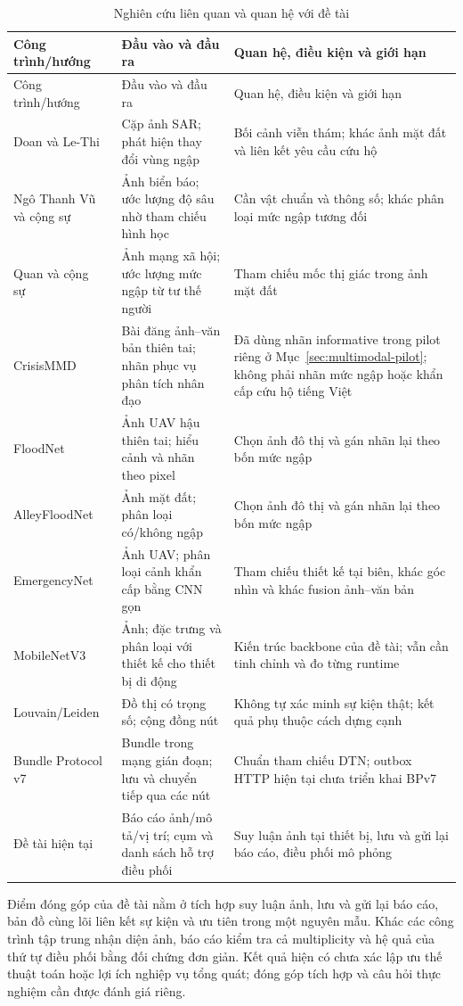 \begin{longtable}{P{.23\textwidth}P{.31\textwidth}P{.35\textwidth}}
\caption{Nghiên cứu liên quan và quan hệ với đề tài}\label{tab:related-work}\\
\toprule Công trình/hướng & Đầu vào và đầu ra & Quan hệ, điều kiện và giới hạn \\\midrule\endfirsthead
\toprule Công trình/hướng & Đầu vào và đầu ra & Quan hệ, điều kiện và giới hạn \\\midrule\endhead
Doan và Le-Thi~\citep{doan2025sar} & Cặp ảnh SAR; phát hiện thay đổi vùng ngập & Bối cảnh viễn thám; khác ảnh mặt đất và liên kết yêu cầu cứu hộ \\
Ngô Thanh Vũ và cộng sự~\citep{ngo2025urban} & Ảnh biển báo; ước lượng độ sâu nhờ tham chiếu hình học & Cần vật chuẩn và thông số; khác phân loại mức ngập tương đối \\
Quan và cộng sự~\citep{quan2020floodlevel} & Ảnh mạng xã hội; ước lượng mức ngập từ tư thế người & Tham chiếu mốc thị giác trong ảnh mặt đất \\
CrisisMMD \citep{alam2018crisismmd} & Bài đăng ảnh--văn bản thiên tai; nhãn phục vụ phân tích nhân đạo & Đã dùng nhãn informative trong pilot riêng ở Mục~\ref{sec:multimodal-pilot}; không phải nhãn mức ngập hoặc khẩn cấp cứu hộ tiếng Việt \\
FloodNet \citep{rahnemoonfar2021floodnet} & Ảnh UAV hậu thiên tai; hiểu cảnh và nhãn theo pixel & Chọn ảnh đô thị và gán nhãn lại theo bốn mức ngập \\
AlleyFloodNet \citep{lee2025alleyfloodnet} & Ảnh mặt đất; phân loại có/không ngập & Chọn ảnh đô thị và gán nhãn lại theo bốn mức ngập \\
EmergencyNet \citep{kyrkou2020emergencynet} & Ảnh UAV; phân loại cảnh khẩn cấp bằng CNN gọn & Tham chiếu thiết kế tại biên, khác góc nhìn và khác fusion ảnh--văn bản \\
MobileNetV3 \citep{howard2019mobilenetv3} & Ảnh; đặc trưng và phân loại với thiết kế cho thiết bị di động & Kiến trúc backbone của đề tài; vẫn cần tinh chỉnh và đo từng runtime \\
Louvain/Leiden \citep{blondel2008louvain,traag2019leiden} & Đồ thị có trọng số; cộng đồng nút & Không tự xác minh sự kiện thật; kết quả phụ thuộc cách dựng cạnh \\
Bundle Protocol v7 \citep{rfc9171} & Bundle trong mạng gián đoạn; lưu và chuyển tiếp qua các nút & Chuẩn tham chiếu DTN; outbox HTTP hiện tại chưa triển khai BPv7 \\
Đề tài hiện tại & Báo cáo ảnh/mô tả/vị trí; cụm và danh sách hỗ trợ điều phối & Suy luận ảnh tại thiết bị, lưu và gửi lại báo cáo, điều phối mô phỏng \\
\bottomrule
\end{longtable}

Điểm đóng góp của đề tài nằm ở tích hợp suy luận ảnh, lưu và gửi lại báo cáo, bản đồ cùng lõi liên kết sự kiện và ưu tiên trong một nguyên mẫu. Khác các công trình tập trung nhận diện ảnh, báo cáo kiểm tra cả multiplicity và hệ quả của thứ tự điều phối bằng đối chứng đơn giản. Kết quả hiện có chưa xác lập ưu thế thuật toán hoặc lợi ích nghiệp vụ tổng quát; đóng góp tích hợp và câu hỏi thực nghiệm cần được đánh giá riêng.
